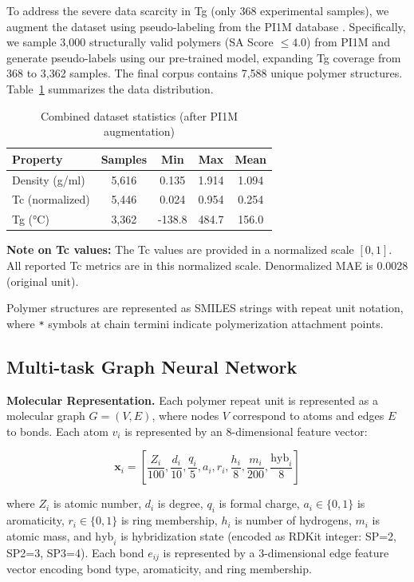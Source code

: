 \documentclass{article}
\begin{document}
To address the severe data scarcity in Tg (only 368 experimental samples),
we augment the dataset using pseudo-labeling from the PI1M database \citep{pi1m_2020}.
Specifically, we sample 3,000 structurally valid polymers (SA Score $\leq 4.0$)
from PI1M and generate pseudo-labels using our pre-trained model, expanding
Tg coverage from 368 to 3,362 samples. The final corpus contains 7,588 unique
polymer structures. Table~\ref{tab:dataset} summarizes the data distribution.

\begin{table}[h]
\centering
\caption{Combined dataset statistics (after PI1M augmentation)}
\label{tab:dataset}
\begin{tabular}{lcccc}
\toprule
Property & Samples & Min & Max & Mean \\
\midrule
Density (g/ml) & 5,616 & 0.135 & 1.914 & 1.094 \\
Tc (normalized) & 5,446 & 0.024 & 0.954 & 0.254 \\
Tg (°C)        & 3,362 & -138.8 & 484.7 & 156.0 \\
\bottomrule
\end{tabular}
\end{table}

\noindent\textbf{Note on Tc values:} The Tc values are provided in a normalized
scale $[0, 1]$. All reported Tc metrics are in this normalized scale.
Denormalized MAE is 0.0028 (original unit).

Polymer structures are represented as SMILES strings with repeat unit notation,
where \texttt{*} symbols at chain termini indicate polymerization attachment points.

\subsection{Multi-task Graph Neural Network}

\noindent\textbf{Molecular Representation.}
Each polymer repeat unit is represented as a molecular graph $G = (V, E)$,
where nodes $V$ correspond to atoms and edges $E$ to bonds.
Each atom $v_i$ is represented by an 8-dimensional feature vector:

\begin{equation}
\mathbf{x}_i = [\frac{Z_i}{100}, \frac{d_i}{10}, \frac{q_i}{5},
a_i, r_i, \frac{h_i}{8}, \frac{m_i}{200}, \frac{\text{hyb}_i}{8}]
\end{equation}

where $Z_i$ is atomic number, $d_i$ is degree, $q_i$ is formal charge,
$a_i \in \{0,1\}$ is aromaticity, $r_i \in \{0,1\}$ is ring membership,
$h_i$ is number of hydrogens, $m_i$ is atomic mass, and
$\text{hyb}_i$ is hybridization state (encoded as RDKit integer: SP=2, SP2=3, SP3=4).
Each bond $e_{ij}$ is represented by a 3-dimensional edge feature vector
encoding bond type, aromaticity, and ring membership.
\end{document}
